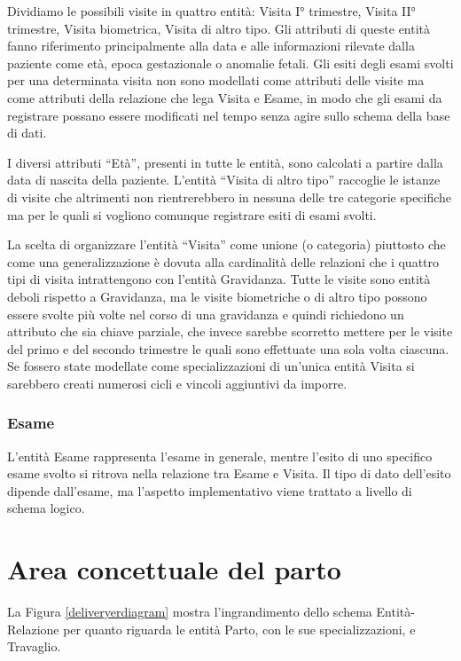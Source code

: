Dividiamo le possibili visite in quattro entità: Visita I° trimestre, Visita II° trimestre, Visita biometrica, Visita di altro tipo.
Gli attributi di queste entità fanno riferimento principalmente alla data e alle informazioni rilevate dalla paziente come età, epoca gestazionale o anomalie fetali.
Gli esiti degli esami svolti per una determinata visita non sono modellati come attributi delle visite ma come attributi della relazione che lega Visita e Esame, in modo che gli esami da registrare possano essere modificati nel tempo senza agire sullo schema della base di dati.

I diversi attributi \enquote{Età}, presenti in tutte le entità, sono calcolati a partire dalla data di nascita della paziente.
L'entità \enquote{Visita di altro tipo} raccoglie le istanze di visite che altrimenti non rientrerebbero in nessuna delle tre categorie specifiche ma per le quali si vogliono comunque registrare esiti di esami svolti.

La scelta di organizzare l'entità \enquote{Visita} come unione (o categoria) piuttosto che come una generalizzazione è dovuta alla cardinalità delle relazioni che i quattro tipi di visita intrattengono con l'entità Gravidanza.
Tutte le visite sono entità deboli rispetto a Gravidanza, ma le visite biometriche o di altro tipo possono essere svolte più volte nel corso di una gravidanza e quindi richiedono un attributo che sia chiave parziale, che invece sarebbe scorretto mettere per le visite del primo e del secondo trimestre le quali sono effettuate una sola volta ciascuna.
Se fossero state modellate come specializzazioni di un'unica entità Visita si sarebbero creati numerosi cicli e vincoli aggiuntivi da imporre. 

\subsubsection{Esame}

L'entità Esame rappresenta l'esame in generale, mentre l'esito di uno specifico esame svolto si ritrova nella relazione tra Esame e Visita.
Il tipo di dato dell'esito dipende dall'esame, ma l'aspetto implementativo viene trattato a livello di schema logico.

\section{Area concettuale del parto}
\label{deliveryconceptual}

La Figura \ref{deliveryerdiagram} mostra l'ingrandimento dello schema Entità-Relazione per quanto riguarda le entità Parto, con le sue specializzazioni, e Travaglio.

